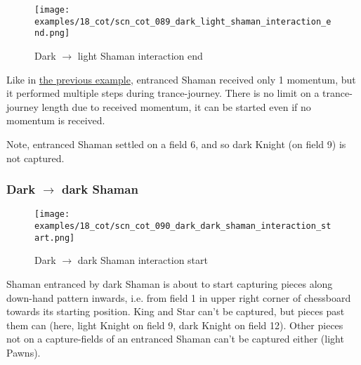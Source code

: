 \clearpage %

\noindent
\begin{figure}[!h]
\texttt{[image: examples/18\_cot/scn\_cot\_089\_dark\_light\_shaman\_interaction\_end.png]}
\caption{Dark $\rightarrow$ light Shaman interaction end}
\label{fig:scn_cot_089_dark_light_shaman_interaction_end}
\end{figure}

Like in
\hyperref[fig:scn_cot_086_light_light_shaman_interaction_start]{the previous example},
entranced Shaman received only 1 momentum, but it performed multiple steps during
trance-journey. There is no limit on a trance-journey length due to received momentum,
it can be started even if no momentum is received.

Note, entranced Shaman settled on a field 6, and so dark Knight (on field 9) is not
captured.

\clearpage %

\subsubsection*{Dark $\rightarrow$ dark Shaman}
\label{sec:Conquest of Tlalocan/Trance-journey/Interactions/Dark --> dark Shaman}

\vspace*{-1.5\baselineskip}
\noindent
\begin{figure}[!h]
\texttt{[image: examples/18\_cot/scn\_cot\_090\_dark\_dark\_shaman\_interaction\_start.png]}
\vspace*{-1.4\baselineskip}
\caption{Dark $\rightarrow$ dark Shaman interaction start}
\label{fig:scn_cot_090_dark_dark_shaman_interaction_start}
\end{figure}

\vspace*{-0.5\baselineskip}
Shaman entranced by dark Shaman is about to start capturing pieces along down-hand
pattern inwards, i.e. from field 1 in upper right corner of chessboard towards its
starting position. \newline
\indent
King and Star can't be captured, but pieces past them can (here, light Knight on
field 9, dark Knight on field 12). Other pieces not on a capture-fields of an
entranced Shaman can't be captured either (light Pawns).

